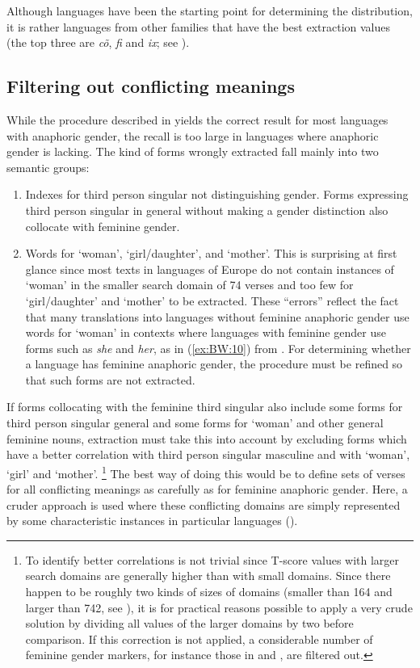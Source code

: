 \documentclass[output=collectionpaper]{langsci/langscibook}
\begin{document}
Although  languages have been the starting point for determining the distribution, it is rather languages from other families that have the best extraction values (the top three are  \textit{cõ},  \textit{fi} and  \textit{ix}; see ).


\subsection{Filtering out conflicting meanings}
\label{sec:BW:3.3}

While the procedure described in  yields the correct result for most languages with anaphoric gender, the recall is too large in languages where anaphoric gender is lacking. The kind of forms wrongly extracted fall mainly into two semantic groups:

\begin{enumerate}[label=(\roman*)]
\item Indexes for third person singular not distinguishing gender. Forms expressing third person singular in general without making a gender distinction also collocate with feminine gender.
\item Words for ‘woman’, ‘girl/daughter’, and ‘mother’. This is surprising at first glance since most texts in  languages of Europe do not contain instances of ‘woman’ in the smaller search domain of 74 verses and too few for ‘girl/daughter’ and ‘mother’ to be extracted. These “errors” reflect the fact that many translations into languages without feminine anaphoric gender use words for ‘woman’ in contexts where languages with feminine gender use forms such as \textit{she} and \textit{her}, as in (\ref{ex:BW:10}) from . For determining whether a language has feminine anaphoric gender, the procedure must be refined so that such forms are not extracted.
\end{enumerate}

If forms collocating with the feminine third singular also include some forms for third person singular general and some forms for ‘woman’ and other general feminine nouns, extraction must take this into account by excluding forms which have a better correlation with third person singular masculine and with ‘woman’, ‘girl’ and ‘mother’.%
\footnote{%
To identify better correlations is not trivial since T-score values with larger search domains are generally higher than with small domains. Since there happen to be roughly two kinds of sizes of domains (smaller than 164 and larger than 742, see ), it is for practical reasons possible to apply a very crude solution by dividing all values of the larger domains by two before comparison. If this correction is not applied, a considerable number of feminine gender markers, for instance those in  and , are filtered out.
} %
The best way of doing this would be to define sets of verses for all conflicting meanings as carefully as for feminine anaphoric gender. Here, a cruder approach is used where these conflicting domains are simply represented by some characteristic instances in particular languages ().
\end{document}
